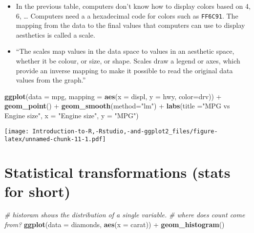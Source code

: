 \documentclass[]{book}
\newenvironment{Shaded}{\begin{snugshade}}{\end{snugshade}}
\newcommand{\KeywordTok}[1]{\textcolor[rgb]{0.13,0.29,0.53}{\textbf{{#1}}}}
\newcommand{\DataTypeTok}[1]{\textcolor[rgb]{0.13,0.29,0.53}{{#1}}}
\newcommand{\StringTok}[1]{\textcolor[rgb]{0.31,0.60,0.02}{{#1}}}
\newcommand{\CommentTok}[1]{\textcolor[rgb]{0.56,0.35,0.01}{\textit{{#1}}}}
\newcommand{\NormalTok}[1]{{#1}}
\begin{document}
\begin{itemize}
\item
  In the previous table, computers don't know how to display colors
  based on 4, 6, \ldots{} Computers need a a hexadecimal code for colors
  such as \texttt{FF6C91}. The mapping from the data to the final values
  that computers can use to display aesthetics is called a scale.
\item
  ``The scales map values in the data space to values in an aesthetic
  space, whether it be colour, or size, or shape. Scales draw a legend
  or axes, which provide an inverse mapping to make it possible to read
  the original data values from the graph.'' \citep{ggplot2}
\end{itemize}

\begin{Shaded}
\begin{Highlighting}[]
\KeywordTok{ggplot}\NormalTok{(}\DataTypeTok{data =} \NormalTok{mpg, }\DataTypeTok{mapping =} \KeywordTok{aes}\NormalTok{(}\DataTypeTok{x =} \NormalTok{displ, }\DataTypeTok{y =} \NormalTok{hwy, }\DataTypeTok{color=}\NormalTok{drv)) +}\StringTok{ }\KeywordTok{geom_point}\NormalTok{() +}\StringTok{ }\KeywordTok{geom_smooth}\NormalTok{(}\DataTypeTok{method=}\StringTok{"lm"}\NormalTok{) +}\StringTok{ }\KeywordTok{labs}\NormalTok{(}\DataTypeTok{title =}\StringTok{"MPG vs Engine size"}\NormalTok{, }\DataTypeTok{x =} \StringTok{"Engine size"}\NormalTok{, }\DataTypeTok{y =} \StringTok{"MPG"}\NormalTok{)}
\end{Highlighting}
\end{Shaded}

\texttt{[image: Introduction-to-R,-Rstudio,-and-ggplot2\_files/figure-latex/unnamed-chunk-11-1.pdf]}

\section{\texorpdfstring{Statistical transformations (\textbf{stats} for
short)}{Statistical transformations (stats for short)}}\label{statistical-transformations-stats-for-short}

\begin{Shaded}
\begin{Highlighting}[]
\CommentTok{# historam shows the distribution of a single variable. }
\CommentTok{# where does count come from? }
\KeywordTok{ggplot}\NormalTok{(}\DataTypeTok{data =} \NormalTok{diamonds, }\KeywordTok{aes}\NormalTok{(}\DataTypeTok{x =} \NormalTok{carat)) +}\StringTok{ }\KeywordTok{geom_histogram}\NormalTok{()}
\end{Highlighting}
\end{Shaded}
\end{document}
